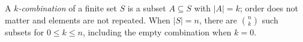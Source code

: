 
A \emph{$k$-combination} of a finite set $S$ is a subset $A\subseteq S$ with $|A|=k$; order does not matter and elements are not repeated. When $|S|=n$, there are $\binom nk$ such subsets for $0\le k\le n$, including the empty combination when $k=0$.

